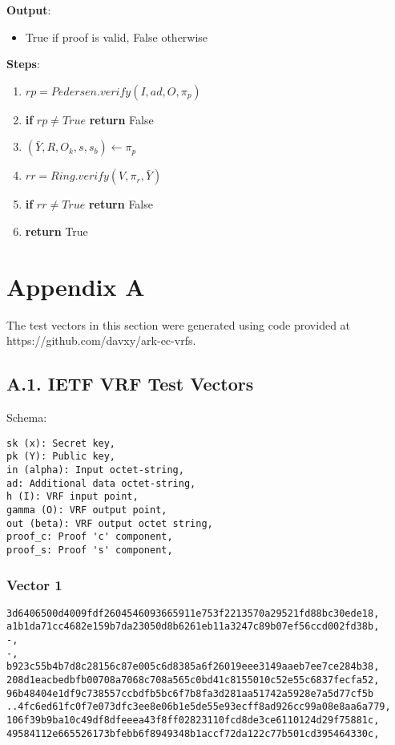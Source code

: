 \documentclass[
]{article}
\providecommand{\tightlist}{%
  \setlength{\itemsep}{0pt}\setlength{\parskip}{0pt}}
\begin{document}
\textbf{Output}:

\begin{itemize}
\tightlist
\item
  True if proof is valid, False otherwise
\end{itemize}

\textbf{Steps}:

\begin{enumerate}
\def\labelenumi{\arabic{enumi}.}
\tightlist
\item
  \(rp = Pedersen.verify(I, ad, O, \pi_p)\)
\item
  \textbf{if} \(rp \neq True\) \textbf{return} False
\item
  \((\bar{Y}, R, O_k, s, s_b) \leftarrow \pi_p\)
\item
  \(rr = Ring.verify(V, \pi_r, \bar{Y})\)
\item
  \textbf{if} \(rr \neq True\) \textbf{return} False
\item
  \textbf{return} True
\end{enumerate}

\hypertarget{appendix-a}{%
\section{Appendix A}\label{appendix-a}}

The test vectors in this section were generated using code provided at
https://github.com/davxy/ark-ec-vrfs.

\hypertarget{a.1.-ietf-vrf-test-vectors}{%
\subsection{A.1. IETF VRF Test
Vectors}\label{a.1.-ietf-vrf-test-vectors}}

Schema:

\begin{verbatim}
sk (x): Secret key,
pk (Y): Public key,
in (alpha): Input octet-string,
ad: Additional data octet-string,
h (I): VRF input point,
gamma (O): VRF output point,
out (beta): VRF output octet string,
proof_c: Proof 'c' component,
proof_s: Proof 's' component,
\end{verbatim}

\hypertarget{vector-1}{%
\subsubsection{Vector 1}\label{vector-1}}

\begin{verbatim}
3d6406500d4009fdf2604546093665911e753f2213570a29521fd88bc30ede18,
a1b1da71cc4682e159b7da23050d8b6261eb11a3247c89b07ef56ccd002fd38b,
-,
-,
b923c55b4b7d8c28156c87e005c6d8385a6f26019eee3149aaeb7ee7ce284b38,
208d1eacbedbfb00708a7068c708a565c0bd41c8155010c52e55c6837fecfa52,
96b48404e1df9c738557ccbdfb5bc6f7b8fa3d281aa51742a5928e7a5d77cf5b
..4fc6ed61fc0f7e073dfc3ee8e06b1e5de55e93ecff8ad926cc99a08e8aa6a779,
106f39b9ba10c49df8dfeeea43f8ff02823110fcd8de3ce6110124d29f75881c,
49584112e665526173bfebb6f8949348b1accf72da122c77b501cd395464330c,
\end{verbatim}
\end{document}
